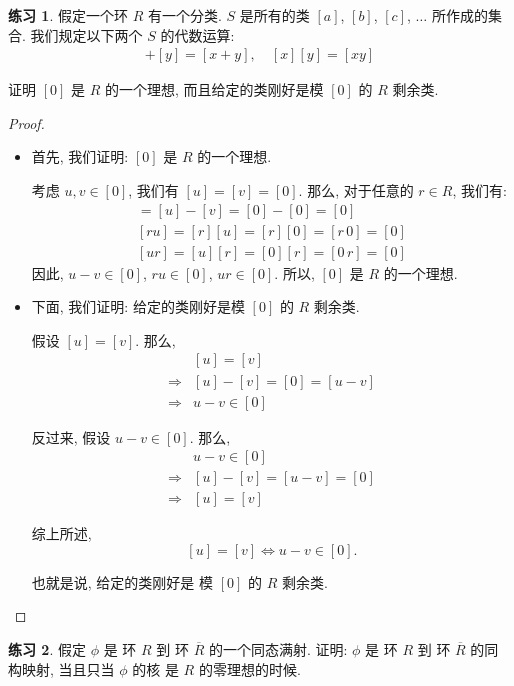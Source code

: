 \documentclass[utf8]{ctexbook}
\theoremstyle{definition}
\newtheorem{exercise}{练习}[section]
\begin{document}
\begin{exercise}
假定一个环 $R$ 有一个分类. $S$ 是所有的类 $[a]$, $[b]$, $[c]$, $\ldots$ 所作成的集合. 我们规定以下两个 $S$ 的代数运算:
\begin{align*}
[x] +[y] =[x+y], \quad [x][y] = [xy]
\end{align*}

证明 $[0]$ 是 $R$ 的一个理想, 而且给定的类刚好是模 $[0]$ 的 $R$ 剩余类.
\end{exercise}

\begin{proof}
\begin{itemize}
\item{首先, 我们证明: $[0]$ 是 $R$ 的一个理想.

考虑 $u, v \in [0]$, 我们有 $[u] =[v] =[0]$. 那么, 对于任意的 $r \in R$, 我们有:
\begin{align*}
[u-v] = [u] -[v] = [0] - [0] = [0] \\
[ru] = [r] [u] = [r] [0] = [r \, 0] = [0] \\
[u r] = [u][r] = [0] [r] = [0 \, r] =  [0]
\end{align*}
因此, $u - v \in [0]$, $r u \in [0]$, $u r \in [0]$. 所以, $[0]$ 是 $R$ 的一个理想.
}
\item{下面, 我们证明: 给定的类刚好是模 $[0]$ 的 $R$ 剩余类.

假设 $[u] =[v]$. 那么, 
\begin{align*}
& [u] = [v] \\
\Longrightarrow  & [u] - [v] = [0] = [u-v] \\
\Longrightarrow& u - v \in [0] 
\end{align*}

反过来, 假设 $u - v \in [0]$. 那么,
\begin{align*}
& u - v \in [0] \\
\Longrightarrow & [u] - [v] = [u-v] = [0] \\
\Longrightarrow & [u] = [v]
\end{align*}

综上所述, 
$$[u] = [v] \iff u - v \in [0]. $$

也就是说, 给定的类刚好是 模 $[0]$ 的 $R$ 剩余类.
}
\end{itemize}

\end{proof}

\begin{exercise}
假定 $\phi$ 是 环 $R$ 到 环 $\overline{R}$ 的一个同态满射. 证明: $\phi$ 是 环 $R$ 到 环 $\overline{R}$ 的同构映射, 当且只当 $\phi$ 的核 是 $R$ 的零理想的时候.
\end{exercise}
\end{document}
